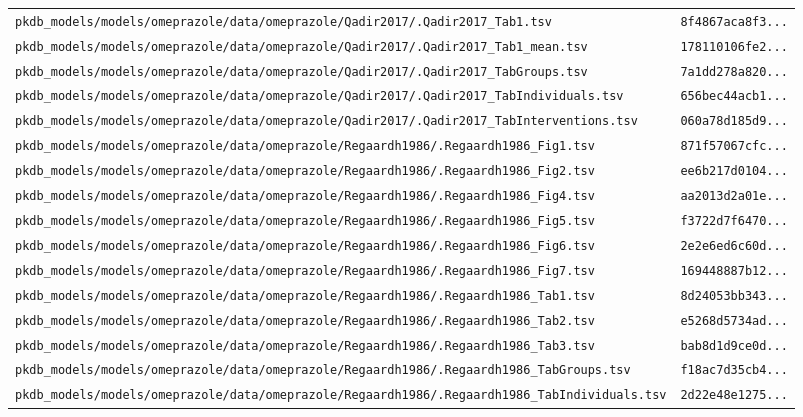 \documentclass{article}
\begin{document}
\begin{longtable}{ll}
\texttt{pkdb\_models/models/omeprazole/data/omeprazole/Qadir2017/.Qadir2017\_Tab1.tsv} & \texttt{8f4867aca8f3...} \\
\texttt{pkdb\_models/models/omeprazole/data/omeprazole/Qadir2017/.Qadir2017\_Tab1\_mean.tsv} & \texttt{178110106fe2...} \\
\texttt{pkdb\_models/models/omeprazole/data/omeprazole/Qadir2017/.Qadir2017\_TabGroups.tsv} & \texttt{7a1dd278a820...} \\
\texttt{pkdb\_models/models/omeprazole/data/omeprazole/Qadir2017/.Qadir2017\_TabIndividuals.tsv} & \texttt{656bec44acb1...} \\
\texttt{pkdb\_models/models/omeprazole/data/omeprazole/Qadir2017/.Qadir2017\_TabInterventions.tsv} & \texttt{060a78d185d9...} \\
\texttt{pkdb\_models/models/omeprazole/data/omeprazole/Regaardh1986/.Regaardh1986\_Fig1.tsv} & \texttt{871f57067cfc...} \\
\texttt{pkdb\_models/models/omeprazole/data/omeprazole/Regaardh1986/.Regaardh1986\_Fig2.tsv} & \texttt{ee6b217d0104...} \\
\texttt{pkdb\_models/models/omeprazole/data/omeprazole/Regaardh1986/.Regaardh1986\_Fig4.tsv} & \texttt{aa2013d2a01e...} \\
\texttt{pkdb\_models/models/omeprazole/data/omeprazole/Regaardh1986/.Regaardh1986\_Fig5.tsv} & \texttt{f3722d7f6470...} \\
\texttt{pkdb\_models/models/omeprazole/data/omeprazole/Regaardh1986/.Regaardh1986\_Fig6.tsv} & \texttt{2e2e6ed6c60d...} \\
\texttt{pkdb\_models/models/omeprazole/data/omeprazole/Regaardh1986/.Regaardh1986\_Fig7.tsv} & \texttt{169448887b12...} \\
\texttt{pkdb\_models/models/omeprazole/data/omeprazole/Regaardh1986/.Regaardh1986\_Tab1.tsv} & \texttt{8d24053bb343...} \\
\texttt{pkdb\_models/models/omeprazole/data/omeprazole/Regaardh1986/.Regaardh1986\_Tab2.tsv} & \texttt{e5268d5734ad...} \\
\texttt{pkdb\_models/models/omeprazole/data/omeprazole/Regaardh1986/.Regaardh1986\_Tab3.tsv} & \texttt{bab8d1d9ce0d...} \\
\texttt{pkdb\_models/models/omeprazole/data/omeprazole/Regaardh1986/.Regaardh1986\_TabGroups.tsv} & \texttt{f18ac7d35cb4...} \\
\texttt{pkdb\_models/models/omeprazole/data/omeprazole/Regaardh1986/.Regaardh1986\_TabIndividuals.tsv} & \texttt{2d22e48e1275...} \\

\end{longtable}
\end{document}
